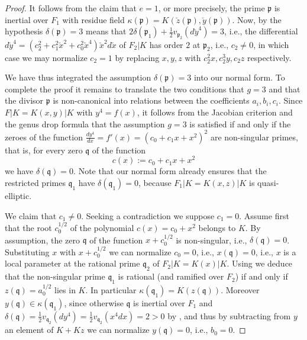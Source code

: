 \documentclass[12pt,reqno]{amsart}
\newcommand{\todoo}[2][]{\todo[size=tiny, #1]{#2}} %
\newcommand{\toda}[2][]{\todo[color=blue!30, #1]{#2}} %
\theoremstyle{definition}
\newcommand{\cx}{{\breve{x}}}
\newcommand{\cy}{{\breve{y}}}
\newcommand{\cz}{{\breve{z}}}
\newcommand{\pp}{\mathfrak{p}}
\newcommand{\fq}{\mathfrak{q}}
\newcommand{\de}{\delta}
\newcommand{\ka}{\kappa}
\begin{document}
\begin{proof}
It follows from the claim that $e=1$, or more precisely, the prime $\pp$ is inertial over $F_1$ with residue field $\ka(\pp)=K(\cz(\pp),\cy(\pp))$.
Now, by \cite[Theorem~2.3]{BedSt87} the hypothesis $\de(\pp)=3$ means that $2\de(\pp_1) + \frac 12 v_{\pp_2}(d\cy^4)=3$, i.e.,
the differential $d\cy^4 = (c_2^2 + c_1^2 \cx^2 + c_0^2 \cx^4) \cx^2 d\cx$ of $F_2|K$ has order $2$ at $\pp_2$, i.e., $c_2\neq 0$, in which case we may normalize $c_2=1$ by replacing $x,y,z$ with $c_2^2 x,c_2^3 y,c_2 z$ respectively.

We have thus integrated the assumption $\de(\pp)=3$ into our normal form.
To complete the proof it remains to translate the two conditions that $g=3$ and that the divisor $\pp$ is non-canonical into relations between the coefficients $a_i,b_i,c_i$.
Since $F|K=K(x,y)|K$ with $y^4 = f(x)$, it follows from
the Jacobian criterion \cite[Corollaries~4.5 and~4.6]{Sal11} and the genus drop formula \cite[Formula~2.3]{HiSt22}
that the assumption $g=3$ is satisfied if and only if the zeroes of the function $\frac{dy^4}{dx}=f'(x)=(c_0 + c_1 x + x^2)^2$ are non-singular primes, that is, for every zero $\fq$ of the function
\[ c(x) := c_0 + c_1 x + x^2 \]
we have $\de(\fq)=0$.
Note that our normal form already ensures that the restricted primes $\fq_1$ have $\de(\fq_1)=0$, because $F_1|K=K(x,z)|K$ is quasi-elliptic.

We claim that $c_1\neq0$.
Seeking a contradiction we suppose $c_1=0$.
Assume first that the root $c_0^{1/2}$ of the polynomial $c(x) = c_0 + x^2$ belongs to $K$.
By assumption, the zero $\fq$ of the function $x+c_0^{1/2}$ is non-singular, i.e., $\de(\fq)=0$.
Substituting $x$ with $x+c_0^{1/2}$ we can normalize $c_0=0$, i.e., $x(\fq)=0$, i.e., $x$ is a local parameter at the rational prime $\fq_2$ of $F_2|K=K(x)|K$.
Using \cite[Proposition~4.1]{BedSt87} we deduce that the non-singular prime $\fq_1$ is rational (and ramified over $F_2$) if and only if $z(\fq)=a_0^{1/2}$ lies in $K$.
In particular $\ka(\fq_1)=K(z(\fq))$.
Moreover $y(\fq)\in\ka(\fq_1)$, since otherwise $\fq$ is inertial over $F_1$ and $\de(\fq) = \frac 12 v_{\fq_2}(dy^4) = \frac12 v_{\fq_2}(x^4 dx) = 2 > 0$ by \cite[Theorem~2.3]{BedSt87}, 
and thus by subtracting from $y$ an element of $K+Kz$ we can normalize $y(\fq)=0$, i.e., $b_0=0$.



\end{proof}
\end{document}
